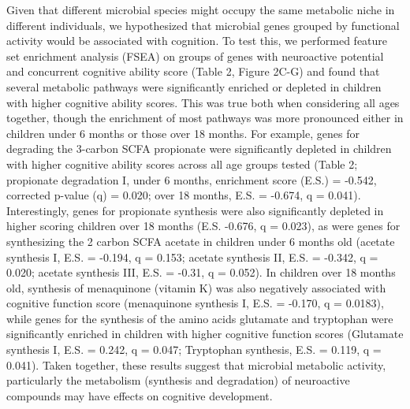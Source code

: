 \documentclass{article}
\begin{document}
Given that different microbial species might occupy the same metabolic
niche in different individuals, we hypothesized that microbial genes
grouped by functional activity would be associated with cognition. To
test this, we performed feature set enrichment analysis (FSEA) on groups
of genes with neuroactive potential
\cite{valles-colomerNeuroactivePotentialHuman2019}
and concurrent cognitive ability score (Table 2, Figure 2C-G) and found that
several metabolic pathways were significantly enriched or depleted in
children with higher cognitive ability scores. This was true both when
considering all ages together, though the enrichment of most
pathways was more pronounced either in children under 6 months or those over 18
months. For example, genes for degrading the 3-carbon SCFA propionate
were significantly depleted in children with higher cognitive ability
scores across all age groups tested (Table 2; propionate degradation I,
under 6 months, enrichment score (E.S.) = -0.542, corrected p-value (q)
= 0.020; over 18 months, E.S. = -0.674, q = 0.041). Interestingly, genes
for propionate synthesis were also significantly depleted in higher
scoring children over 18 months (E.S. -0.676, q = 0.023), as were genes
for synthesizing the 2 carbon SCFA acetate in children under 6 months
old (acetate synthesis I, E.S. = -0.194, q = 0.153; acetate synthesis
II, E.S. = -0.342, q = 0.020; acetate synthesis III, E.S. = -0.31, q = 0.052).
In children over 18 months old, synthesis of menaquinone (vitamin K)
was also negatively associated with cognitive function score (menaquinone synthesis I,
E.S. = -0.170, q = 0.0183), while
genes for the synthesis of the amino acids
glutamate and tryptophan were significantly enriched in children with
higher cognitive function scores (Glutamate synthesis I, E.S. = 0.242, 
q = 0.047; Tryptophan synthesis, E.S. = 0.119, q = 0.041).
Taken together, these results suggest that
microbial metabolic activity, particularly the metabolism (synthesis and
degradation) of neuroactive compounds may have effects on cognitive
development.
\end{document}
